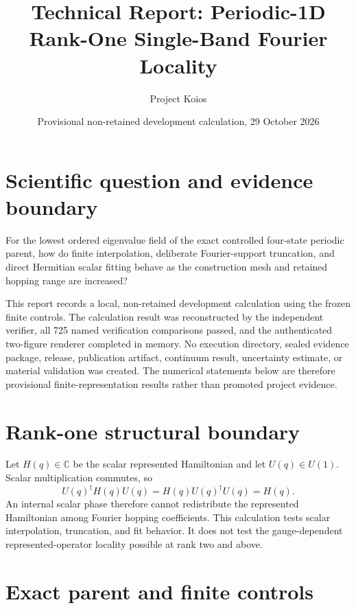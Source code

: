 \documentclass[11pt]{article}
\title{Technical Report: Periodic-1D Rank-One Single-Band Fourier Locality}
\author{Project Koios}
\date{Provisional non-retained development calculation, 29 October 2026}
\begin{document}
\maketitle

\section{Scientific question and evidence boundary}

For the lowest ordered eigenvalue field of the exact controlled four-state periodic
parent, how do finite interpolation, deliberate Fourier-support truncation, and direct
Hermitian scalar fitting behave as the construction mesh and retained hopping range are
increased?

This report records a local, non-retained development calculation using the frozen
finite controls.  The calculation result was reconstructed by the independent verifier,
all 725 named verification comparisons passed, and the authenticated two-figure
renderer completed in memory.  No execution directory, sealed evidence package,
release, publication artifact, continuum result, uncertainty estimate, or material
validation was created.  The numerical statements below are therefore provisional
finite-representation results rather than promoted project evidence.

\section{Rank-one structural boundary}

Let $H(q)\in\mathbb{C}$ be the scalar represented Hamiltonian and let
$U(q)\in U(1)$.  Scalar multiplication commutes, so
\begin{equation}
 U(q)^\dagger H(q)U(q)=H(q)U(q)^\dagger U(q)=H(q).
\end{equation}
An internal scalar phase therefore cannot redistribute the represented Hamiltonian
among Fourier hopping coefficients.  This calculation tests scalar interpolation,
truncation, and fit behavior.  It does not test the gauge-dependent represented-operator
locality possible at rank two and above.

\section{Exact parent and finite controls}
\end{document}
